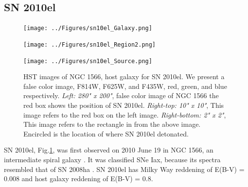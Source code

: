 \documentclass[preprint]{aastex}
\begin{document}
\subsection{SN 2010el}
	\begin{figure}
	\begin{minipage}[c][7cm]{.6\textwidth}
		\vspace*{\fill}
		\hspace*{-1.5cm}\texttt{[image: ../Figures/sn10el\_Galaxy.png]}
			\label{fig:10elgal}
	\end{minipage}
	\begin{minipage}[c][7cm]{.5\textwidth}
		\hspace*{-.3cm}\texttt{[image: ../Figures/sn10el\_Region2.png]}
			\label{fig:r10el}\par
		\hspace*{-.3cm}\texttt{[image: ../Figures/sn10el\_Source.png]}
			\label{fig:s10el}
	\end{minipage}
	\newline\caption{HST images of NGC 1566, host galaxy for SN 2010el. We present a false color image,
	 F814W, F625W, and F435W, red, green, and blue respectively. \textit{Left: 280" x 200"}, false color image of 
	NGC 1566 the red box shows the position of SN 2010el. \textit{Right-top: 10" x 10"}, This image refers to the red 
	box on the left image. \textit{Right-bottom: 2" x 2"}, This image refers to the rectangle in from the above image. 
	Encircled is the location of where SN 2010el detonated.}
	\label{fig:10el_whole}
	\end{figure}
SN 2010el, Fig.\ref{fig:10el_whole}, was first observed on 2010 June 19 in NGC 1566, 
an intermediate spiral galaxy \citep{mon10}. 
It was classified SNe Iax, because its
spectra resembled that of SN 2008ha \citep{bes10}.
SN 2010el has Milky Way reddening of E(B-V) = 0.008 and host galaxy reddening of 
E(B-V) = 0.8. 



\end{document}

